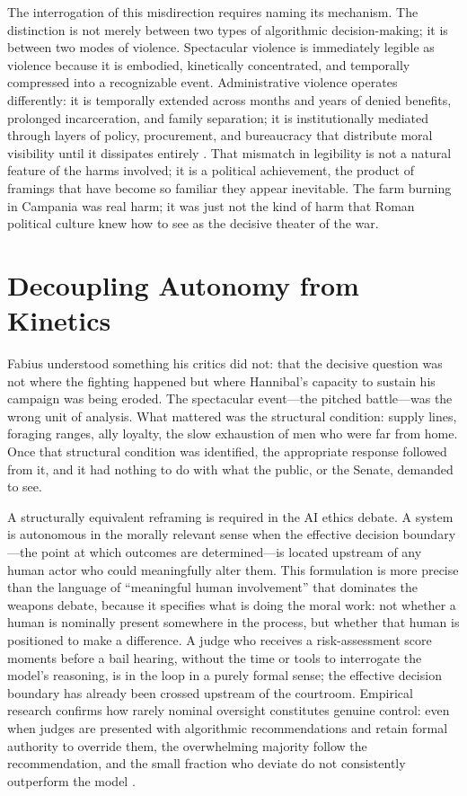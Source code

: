 \documentclass[12pt, a4paper]{article}
\begin{document}
The interrogation of this misdirection requires naming its mechanism. The distinction is not merely between two types of algorithmic decision-making; it is between two modes of violence. Spectacular violence is immediately legible as violence because it is embodied, kinetically concentrated, and temporally compressed into a recognizable event. Administrative violence operates differently: it is temporally extended across months and years of denied benefits, prolonged incarceration, and family separation; it is institutionally mediated through layers of policy, procurement, and bureaucracy that distribute moral visibility until it dissipates entirely \citep{galtung1969, bellanova2021}. That mismatch in legibility is not a natural feature of the harms involved; it is a political achievement, the product of framings that have become so familiar they appear inevitable. The farm burning in Campania was real harm; it was just not the kind of harm that Roman political culture knew how to see as the decisive theater of the war.

\section{Decoupling Autonomy from Kinetics}

Fabius understood something his critics did not: that the decisive question was not where the fighting happened but where Hannibal's capacity to sustain his campaign was being eroded. The spectacular event---the pitched battle---was the wrong unit of analysis. What mattered was the structural condition: supply lines, foraging ranges, ally loyalty, the slow exhaustion of men who were far from home. Once that structural condition was identified, the appropriate response followed from it, and it had nothing to do with what the public, or the Senate, demanded to see.

A structurally equivalent reframing is required in the AI ethics debate. A system is autonomous in the morally relevant sense when the effective decision boundary---the point at which outcomes are determined---is located upstream of any human actor who could meaningfully alter them. This formulation is more precise than the language of \enquote{meaningful human involvement} that dominates the weapons debate, because it specifies what is doing the moral work: not whether a human is nominally present somewhere in the process, but whether that human is positioned to make a difference. A judge who receives a risk-assessment score moments before a bail hearing, without the time or tools to interrogate the model's reasoning, is in the loop in a purely formal sense; the effective decision boundary has already been crossed upstream of the courtroom. Empirical research confirms how rarely nominal oversight constitutes genuine control: even when judges are presented with algorithmic recommendations and retain formal authority to override them, the overwhelming majority follow the recommendation, and the small fraction who deviate do not consistently outperform the model \citep{angelova2023, kleinberg2018}.
\end{document}
